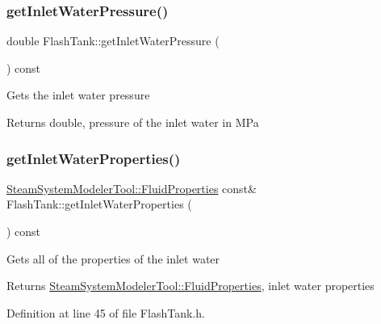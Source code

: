 \subsubsection{\texorpdfstring{get\+Inlet\+Water\+Pressure()}{getInletWaterPressure()}\hspace{0.1cm}{\footnotesize\ttfamily [3/3]}}
{\footnotesize\ttfamily double Flash\+Tank\+::get\+Inlet\+Water\+Pressure (\begin{DoxyParamCaption}{ }\end{DoxyParamCaption}) const}

Gets the inlet water pressure \begin{DoxyReturn}{Returns}
double, pressure of the inlet water in M\+Pa 
\end{DoxyReturn}
\mbox{\label{class_flash_tank_a582b3e730f1619891533965940d692de}} 
\subsubsection{\texorpdfstring{get\+Inlet\+Water\+Properties()}{getInletWaterProperties()}\hspace{0.1cm}{\footnotesize\ttfamily [1/3]}}
{\footnotesize\ttfamily \hyperlink{struct_steam_system_modeler_tool_1_1_fluid_properties}{Steam\+System\+Modeler\+Tool\+::\+Fluid\+Properties} const\& Flash\+Tank\+::get\+Inlet\+Water\+Properties (\begin{DoxyParamCaption}{ }\end{DoxyParamCaption}) const\hspace{0.3cm}{\ttfamily [inline]}}

Gets all of the properties of the inlet water \begin{DoxyReturn}{Returns}
\hyperlink{struct_steam_system_modeler_tool_1_1_fluid_properties}{Steam\+System\+Modeler\+Tool\+::\+Fluid\+Properties}, inlet water properties 
\end{DoxyReturn}


Definition at line 45 of file Flash\+Tank.\+h.

\mbox{\label{class_flash_tank_a582b3e730f1619891533965940d692de}} 
